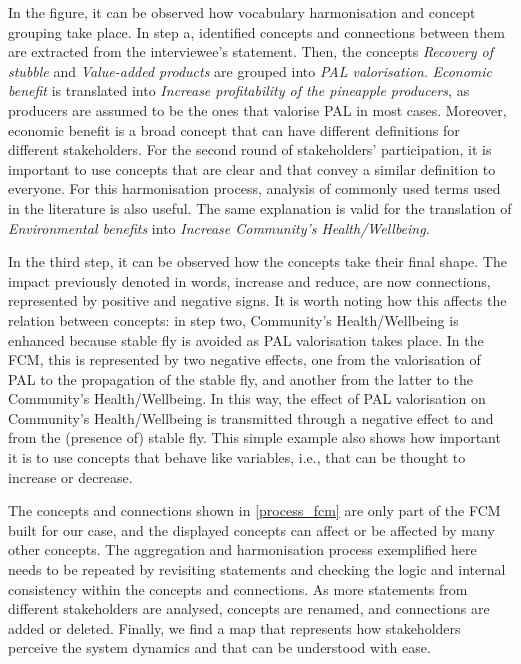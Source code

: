 In the figure, it can be observed how vocabulary harmonisation and concept grouping take place. In step a, identified concepts and connections between them are extracted from the interviewee's statement. Then, the concepts \textit{Recovery of stubble} and \textit{Value-added products} are grouped into \textit{PAL valorisation}. \textit{Economic benefit} is translated into \textit{Increase profitability of the pineapple producers}, as producers are assumed to be the ones that valorise PAL in most cases. Moreover, economic benefit is a broad concept that can have different definitions for different stakeholders. For the second round of stakeholders' participation, it is important to use concepts that are clear and that convey a similar definition to everyone. For this harmonisation process, analysis of commonly used terms used in the literature is also useful. The same explanation is valid for the translation of \textit{Environmental benefits} into \textit{Increase Community’s Health/Wellbeing}. 

In the third step, it can be observed how the concepts take their final shape. The impact previously denoted in words, increase and reduce, are now connections, represented by positive and negative signs. It is worth noting how this affects the relation between concepts: in step two, Community's Health/Wellbeing is enhanced because stable fly is avoided as PAL valorisation takes place. In the FCM, this is represented by two negative effects, one from the valorisation of PAL to the propagation of the stable fly, and another from the latter to the Community’s Health/Wellbeing. In this way, the effect of PAL valorisation on Community’s Health/Wellbeing is transmitted through a negative effect to and from the (presence of) stable fly. This simple example also shows how important it is to use concepts that behave like variables, i.e., that can be thought to increase or decrease. 

The concepts and connections shown in \cref{process_fcm} are only part of the FCM built for our case, and the displayed concepts can affect or be affected by many other concepts. The aggregation and harmonisation process exemplified here needs to be repeated by revisiting statements and checking the logic and internal consistency within the concepts and connections. As more statements from different stakeholders are analysed, concepts are renamed, and connections are added or deleted. Finally, we find a map that represents how stakeholders perceive the system dynamics and that can be understood with ease. 

